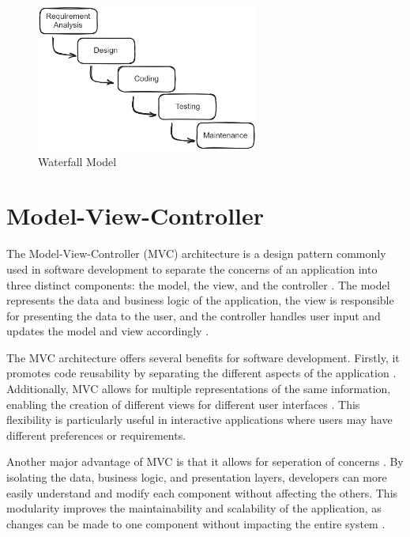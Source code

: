 \begin{figure}[!ht]
	\centering
	\includegraphics[width=0.65\textwidth]{texs/Part2/chapter1/image/waterfall.png}
	\caption{Waterfall Model}
	\label{fig:waterfall-model}
\end{figure}


\section{Model-View-Controller}
\label{sec:model-view-controller}

The Model-View-Controller (MVC) architecture is a design pattern commonly used in software development to separate the concerns of an application into three distinct components: the model, the view, and the controller \cite[47]{Garca2023}. The model represents the data and business logic of the application, the view is responsible for presenting the data to the user, and the controller handles user input and updates the model and view accordingly \cite{sarker14}.

The MVC architecture offers several benefits for software development. Firstly, it promotes code reusability by separating the different aspects of the application \cite{sarker14}. Additionally, MVC allows for multiple representations of the same information, enabling the creation of different views for different user interfaces \cite{sarker14}. This flexibility is particularly useful in interactive applications where users may have different preferences or requirements.

Another major advantage of MVC is that it allows for seperation of concerns \cite{Stepien}. By isolating the data, business logic, and presentation layers, developers can more easily understand and modify each component without affecting the others. This modularity improves the maintainability and scalability of the application, as changes can be made to one component without impacting the entire system \cite{Kozon_2023}.

